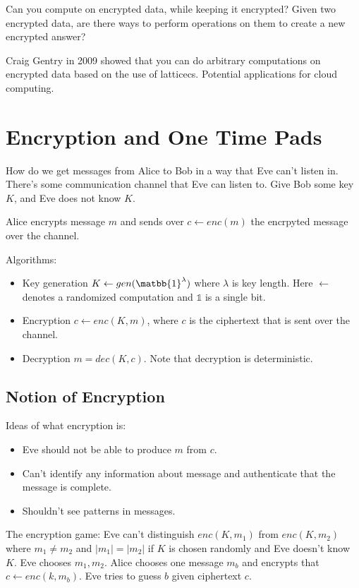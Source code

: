 \documentclass[psamsfonts]{amsart}
\begin{document}
Can you compute on encrypted data, while keeping it encrypted? Given two encrypted data, are there ways to perform operations on them to create a new encrypted answer?

Craig Gentry in 2009 showed that you can do arbitrary computations on encrypted data based on the use of latticecs. Potential applications for cloud computing.

\section{Encryption and One Time Pads}

How do we get messages from Alice to Bob in a way that Eve can't listen in. There's some communication channel that Eve can listen to. Give Bob some key $K$, and Eve does not know $K$. 

Alice encrypts message $m$ and sends over $c \leftarrow enc(m)$ the encrpyted message over the channel.

Algorithms: 
\begin{itemize}
\item Key generation $K \leftarrow gen(\matbb{1}^\lambda)$ where $\lambda$ is key length. Here $\leftarrow$ denotes a randomized computation and $\mathbb{1}$ is a single bit. 
\item Encryption $c \leftarrow enc(K, m)$, where $c$ is the ciphertext that is sent over the channel.
\item Decryption $m = dec(K, c)$. Note that decryption is deterministic. 
\end{itemize}

\subsection{Notion of Encryption}

Ideas of what encryption is:
\begin{itemize}
\item Eve should not be able to produce $m$ from $c$. 
\item Can't identify any information about message and authenticate that the message is complete.
\item Shouldn't see patterns in messages.
\end{itemize}

The encryption game: Eve can't distinguish $enc(K,m_1)$ from $enc(K, m_2)$ where $m_1 \neq m_2$ and $|m_1| = |m_2|$ if $K$ is chosen randomly and Eve doesn't know $K$. Eve chooses $m_1, m_2$. Alice chooses one message $m_b$ and encrypts that $c \leftarrow enc(k, m_b)$. Eve tries to guess $b$ given ciphertext $c$.
\end{document}
